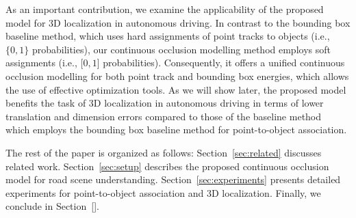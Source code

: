 As an important contribution, we examine the applicability of the proposed model for 3D localization in autonomous driving. In contrast to the bounding box baseline method, which uses hard assignments of point tracks to objects (i.e., $\{0,1\}$ probabilities), our continuous occlusion modelling method employs soft assignments (i.e., [$0,1$] probabilities). Consequently, it offers a unified continuous occlusion modelling for both point track and bounding box energies, which allows the use of effective optimization tools. As we will show later, the proposed model benefits the task of 3D localization in autonomous driving in terms of lower translation and dimension errors compared to those of the baseline method~\cite{Song_Chandraker_2014} which employs the bounding box baseline method for point-to-object association.

The rest of the paper is organized as follows: Section~\ref{sec:related} discusses related work. Section~\ref{sec:setup} describes the proposed continuous occlusion model for road scene understanding. Section~\ref{sec:experiments} presents detailed experiments for point-to-object association and 3D localization. Finally, we conclude in Section~\ref{}.



